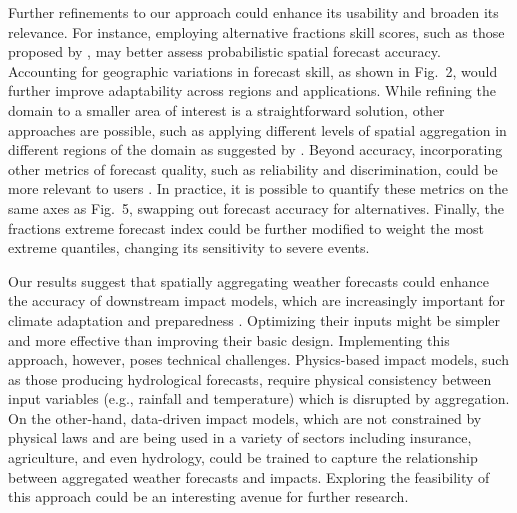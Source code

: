 \documentclass[preprint,12pt,authoryear]{elsarticle}
\begin{document}
Further refinements to our approach could enhance its usability and broaden its relevance. For instance, employing alternative fractions skill scores, such as those proposed by \cite{Necker2024}, may better assess probabilistic spatial forecast accuracy. Accounting for geographic variations in forecast skill, as shown in Fig.~2, would further improve adaptability across regions and applications. While refining the domain to a smaller area of interest is a straightforward solution, other approaches are possible, such as applying different levels of spatial aggregation in different regions of the domain as suggested by \cite{RobertsLean2008}. Beyond accuracy, incorporating other metrics of forecast quality, such as reliability and discrimination, could be more relevant to users \citep{Murphy1993,WeisheimerPalmer2014}. In practice, it is possible to quantify these metrics on the same axes as Fig.~5, swapping out forecast accuracy for alternatives. Finally, the fractions extreme forecast index could be further modified to weight the most extreme quantiles, changing its sensitivity to severe events.  


Our results suggest that spatially aggregating weather forecasts could enhance the accuracy of downstream impact models, which are increasingly important for climate adaptation and preparedness \citep{Merz2020}. Optimizing their inputs might be simpler and more effective than improving their basic design. Implementing this approach, however, poses technical challenges. Physics-based impact models, such as those producing hydrological forecasts, require physical consistency between input variables (e.g., rainfall and temperature) which is disrupted by aggregation. On the other-hand, data-driven impact models, which are not constrained by physical laws and are being used in a variety of sectors including insurance, agriculture, and even hydrology, could be trained to capture the relationship between aggregated weather forecasts and impacts. Exploring the feasibility of this approach could be an interesting avenue for further research.
\end{document}
